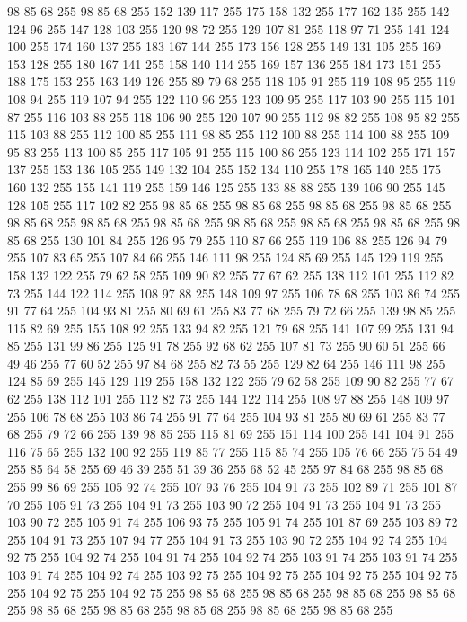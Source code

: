 98 85 68 255 98 85 68 255 152 139 117 255 175 158 132 255 177 162 135 255 142 124 96 255 147 128 103 255 120 98 72 255 129 107 81 255 118 97 71 255 141 124 100 255 174 160 137 255 183 167 144 255 173 156 128 255 149 131 105 255 169 153 128 255 180 167 141 255 158 140 114 255 169 157 136 255 184 173 151 255 188 175 153 255 163 149 126 255 89 79 68 255 118 105 91 255 119 108 95 255 119 108 94 255 119 107 94 255 122 110 96 255 123 109 95 255 117 103 90 255 115 101 87 255 116 103 88 255 118 106 90 255 120 107 90 255 112 98 82 255 108 95 82 255 115 103 88 255 112 100 85 255 111 98 85 255 112 100 88 255 114 100 88 255 109 95 83 255 113 100 85 255 117 105 91 255 115 100 86 255 123 114 102 255 171 157 137 255 153 136 105 255 149 132 104 255 152 134 110 255 178 165 140 255 175 160 132 255 155 141 119 255 159 146 125 255 133 88 88 255 139 106 90 255 145 128 105 255 117 102 82 255 98 85 68 255 98 85 68 255 98 85 68 255 98 85 68 255 98 85 68 255 98 85 68 255
98 85 68 255 98 85 68 255 98 85 68 255 98 85 68 255 98 85 68 255 130 101 84 255 126 95 79 255 110 87 66 255 119 106 88 255 126 94 79 255 107 83 65 255 107 84 66 255 146 111 98 255 124 85 69 255 145 129 119 255 158 132 122 255 79 62 58 255 109 90 82 255 77 67 62 255 138 112 101 255 112 82 73 255 144 122 114 255 108 97 88 255 148 109 97 255 106 78 68 255 103 86 74 255 91 77 64 255 104 93 81 255 80 69 61 255 83 77 68 255 79 72 66 255 139 98 85 255 115 82 69 255 155 108 92 255 133 94 82 255 121 79 68 255 141 107 99 255 131 94 85 255 131 99 86 255 125 91 78 255 92 68 62 255 107 81 73 255 90 60 51 255 66 49 46 255 77 60 52 255 97 84 68 255 82 73 55 255 129 82 64 255 146 111 98 255 124 85 69 255 145 129 119 255 158 132 122 255 79 62 58 255 109 90 82 255 77 67 62 255 138 112 101 255 112 82 73 255 144 122 114 255 108 97 88 255 148 109 97 255 106 78 68 255 103 86 74 255 91 77 64 255 104 93 81 255
80 69 61 255 83 77 68 255 79 72 66 255 139 98 85 255 115 81 69 255 151 114 100 255 141 104 91 255 116 75 65 255 132 100 92 255 119 85 77 255 115 85 74 255 105 76 66 255 75 54 49 255 85 64 58 255 69 46 39 255 51 39 36 255 68 52 45 255 97 84 68 255 98 85 68 255 99 86 69 255 105 92 74 255 107 93 76 255 104 91 73 255 102 89 71 255 101 87 70 255 105 91 73 255 104 91 73 255 103 90 72 255 104 91 73 255 104 91 73 255 103 90 72 255 105 91 74 255 106 93 75 255 105 91 74 255 101 87 69 255 103 89 72 255 104 91 73 255 107 94 77 255 104 91 73 255 103 90 72 255 104 92 74 255 104 92 75 255 104 92 74 255 104 91 74 255 104 92 74 255 103 91 74 255 103 91 74 255 103 91 74 255 104 92 74 255 103 92 75 255 104 92 75 255 104 92 75 255 104 92 75 255 104 92 75 255 104 92 75 255 98 85 68 255 98 85 68 255 98 85 68 255 98 85 68 255 98 85 68 255 98 85 68 255 98 85 68 255 98 85 68 255 98 85 68 255
